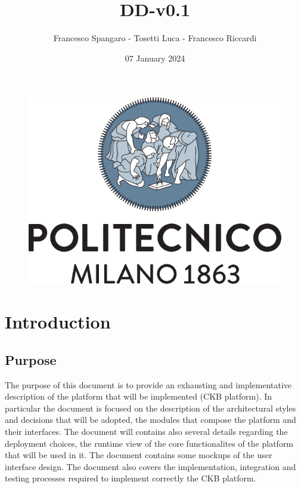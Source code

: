 \documentclass{article}
\title{DD-v0.1}
\author{Francesco Spangaro - Tosetti Luca - Francesco Riccardi}
\date{07 January 2024}
\begin{document}
\maketitle

\begin{figure}[h]
    \centering
    \includegraphics[scale=0.5]{politecnico-di-milano-logo.png}
\end{figure}

\tableofcontents

\newpage
\pagestyle{IntroductionStyle}

\section{Introduction}
    \subsection{Purpose}
        The purpose of this document is to provide an exhausting and implementative
        description of the platform that will be implemented (CKB platform).
        In particular the document is focused on the description of the architectural styles and decisions
        that will be adopted, the modules that compose the platform and their interfaces.
        The document will contains also several details regarding the deployment choices,
        the runtime view of the core functionalites of the platform that will be used in it.
        The document contains some mockups of the user interface design.
        The document also covers the implementation, integration and testing
        processes required to implement correctly the CKB platform.
\end{document}
